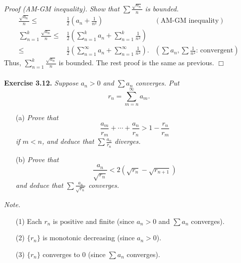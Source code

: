 \documentclass{article}
\begin{document}
\emph{Proof (AM-GM inequality).}
\emph{Show that $\sum\frac{\sqrt{a_n}}{n}$ is bounded.}
\begin{align*}
\frac{\sqrt{a_n}}{n}
\leq&
\frac{1}{2}
\left( a_n + \frac{1}{n^2} \right)
  &(\text{AM-GM inequality}) \\
\sum_{n=1}^{k} \frac{\sqrt{a_n}}{n}
\leq&
\frac{1}{2}
\left( \sum_{n=1}^{k} a_n + \sum_{n=1}^{k} \frac{1}{n^2} \right) \\
\leq&
\frac{1}{2}
\left( \sum_{n=1}^{\infty} a_n + \sum_{n=1}^{\infty} \frac{1}{n^2} \right).
  &\left(\text{$\sum{a_n}, \sum{\frac{1}{n^2}}$: convergent}\right)
\end{align*}
Thus, $\sum_{n=1}^{k}\frac{\sqrt{a_n}}{n}$ is bounded.
The rest proof is the same as previous.
$\Box$ \\\\






\textbf{Exercise 3.12.}
\emph{Suppose $a_n > 0$ and $\sum a_n$ converges.
Put
$$r_n = \sum_{m=n}^{\infty} a_m.$$}
\begin{enumerate}
\item[(a)]
\emph{Prove that
$$\frac{a_m}{r_m} + \cdots + \frac{a_n}{r_n} > 1 - \frac{r_n}{r_m}$$
if $m < n$, and deduce that $\sum \frac{a_n}{r_n}$ diverges.}
\item[(b)]
\emph{Prove that
$$\frac{a_n}{\sqrt{r_n}} < 2(\sqrt{r_n} - \sqrt{r_{n+1}})$$
and deduce that $\sum \frac{a_n}{\sqrt{r_n}}$ converges.} \\
\end{enumerate}

\emph{Note.}
\begin{enumerate}
\item[(1)]
Each $r_n$ is positive and finite (since $a_n > 0$ and $\sum a_n$ converges).
\item[(2)]
$\{r_n\}$ is monotonic decreasing (since $a_n > 0$).
\item[(3)]
$\{r_n\}$ converges to $0$ (since $\sum a_n$ converges). \\
\end{enumerate}
\end{document}
